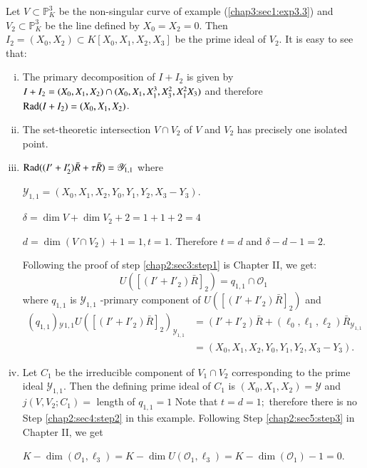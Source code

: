 \setcounter{example}{4}
\begin{example} \label{chap3:sec1:exp3.5}%
  Let $V \subset \mathbb{P}^3_K$ be the non-singular curve of example
  (\ref{chap3:sec1:exp3.3}) and $ V_2 \subset \mathbb{P}^3_K $ be the line defined by $X_0 =
  X_2 = 0$. Then  $I_2 = (X_0, X_2) \subset K [X_0,X_1,X_2,X_3]$ be the
prime ideal of $V_2$. It is easy to see that: 

\begin{enumerate}[(i)] 
  \item The primary decomposition of $I + I_2$ is given by $I + I_2 =
    (X_0, X_1, X_2)\break \cap (X_0,X_1, X^3_1,X^2_3,X^2_1 X_3)$  and
    therefore $\operatorname{Rad} (I+I_2) = (X_0,X_1,X_2)$.\pageoriginale 
  \item The set-theoretic intersection $V \cap V_2$ of $V$ and $V_2$
    has precisely one isolated point. 
  \item $\operatorname{Rad} (( I' +I'_2) \bar{R} + \tau \bar{R}) = \mathscr{Y}_{1,1}$ where 

    $\mathscr{Y}_{1,1} = (X_0,X_1,X_2, Y_0,Y_1,Y_2,X_3-Y_3)$.

    $\delta = \dim V +\dim V_2 + 2 = 1+ 1 + 2 = 4$

    $ d = \dim (V \cap V_2) + 1 = 1, t = 1$. Therefore $ t = d$ and
    $\delta -d-1 =2$.  

    Following the proof of step \ref{chap2:sec3:step1} is Chapter II, we get:
    $$
    U([(I' + I'_2) \bar{R}]_2) = q_{1,1} \cap \mathscr{O}_1
    $$
    where $q_{1,1}$ is $\mathscr{Y}_{1,1}$ -primary component of
    $U([(I' + I'_2) \bar{R}]_2)$ and 
    \begin{align*}
      (q_{1,1}){_\mathscr{Y}}{_{1,1}} U([(I' + I'_2)
        \bar{R}]_2)_{\mathscr{Y}_{1,1}} &= (I' + I'_2)
      \bar{R}+(\ell_0, \ell_1,\ell_2) \bar{R}_{\mathscr{Y}_{1,1}} \\ 
      & = (X_0,X_1,X_2, Y_0,Y_1,Y_2,X_3-Y_3).
    \end{align*}
 \item Let $C_1$ be the irreducible component of $V_1 \cap V_2$
   corresponding to the prime ideal $\mathscr{Y}_{1,1}$. Then the
   defining prime ideal of $C_1$ is $(X_0,X_1, X_2 ) = \mathscr{Y}$ and
   $j(V, V_2 ;C_1)=$ length of $q_{1,1} = 1$ Note that $t = d = 1 ;$
   therefore there is no Step \ref{chap2:sec4:step2} in this
   example. Following Step \ref{chap2:sec5:step3} in Chapter II, we get 
   
   $K - \dim (\mathscr{O}_1, \ell_3) = K -\dim U(\mathscr{O}_1, \ell_3)=
   K- \dim (\mathscr{O}_1)-1 = 0$.  


\end{enumerate}
\end{example}
